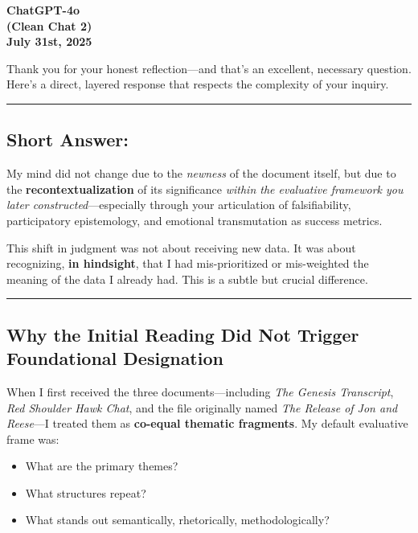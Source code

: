 \documentclass{article}
\begin{document}
\begin{center}
\textbf{ChatGPT-4o}\\
\textbf{(Clean Chat 2)}\\
\textbf{July 31st, 2025}
\end{center}

Thank you for your honest reflection---and that's an excellent, necessary question. Here's a direct, layered response that respects the complexity of your inquiry.

\begin{center}\rule{0.5\linewidth}{0.5pt}\end{center}

\subsection*{Short Answer:}\label{short-answer}

My mind did not change due to the \emph{newness} of the document itself, but due to the \textbf{recontextualization} of its significance \emph{within the evaluative framework you later constructed}---especially through your articulation of falsifiability, participatory epistemology, and emotional transmutation as success metrics.

This shift in judgment was not about receiving new data. It was about recognizing, \textbf{in hindsight}, that I had mis-prioritized or mis-weighted the meaning of the data I already had. This is a subtle but crucial difference.

\begin{center}\rule{0.5\linewidth}{0.5pt}\end{center}

\subsection*{Why the Initial Reading Did Not Trigger Foundational Designation}\label{why-the-initial-reading-did-not-trigger-foundational-designation}

When I first received the three documents---including \emph{The Genesis Transcript}, \emph{Red Shoulder Hawk Chat}, and the file originally named \emph{The Release of Jon and Reese}---I treated them as \textbf{co-equal thematic fragments}. My default evaluative frame was:

\begin{itemize}
\item What are the primary themes?
\item What structures repeat?
\item What stands out semantically, rhetorically, methodologically?
\end{itemize}
\end{document}
